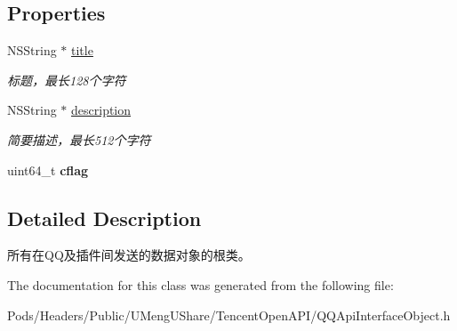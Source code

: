 \subsection*{Properties}
\begin{DoxyCompactItemize}
\item 
\mbox{\label{interface_q_q_api_object_a07041ea1c099b1e2bc45e1676829832e}} 
N\+S\+String $\ast$ \mbox{\hyperlink{interface_q_q_api_object_a07041ea1c099b1e2bc45e1676829832e}{title}}
\begin{DoxyCompactList}\small\item\em 标题，最长128个字符 \end{DoxyCompactList}\item 
\mbox{\label{interface_q_q_api_object_a385f2c391b67a2868a92a22f6e75718b}} 
N\+S\+String $\ast$ \mbox{\hyperlink{interface_q_q_api_object_a385f2c391b67a2868a92a22f6e75718b}{description}}
\begin{DoxyCompactList}\small\item\em 简要描述，最长512个字符 \end{DoxyCompactList}\item 
\mbox{\label{interface_q_q_api_object_af428073e74eec18c300f1054a3728b24}} 
uint64\+\_\+t {\bfseries cflag}
\end{DoxyCompactItemize}


\subsection{Detailed Description}
所有在\+Q\+Q及插件间发送的数据对象的根类。 

The documentation for this class was generated from the following file\+:\begin{DoxyCompactItemize}
\item 
Pods/\+Headers/\+Public/\+U\+Meng\+U\+Share/\+Tencent\+Open\+A\+P\+I/Q\+Q\+Api\+Interface\+Object.\+h\end{DoxyCompactItemize}
